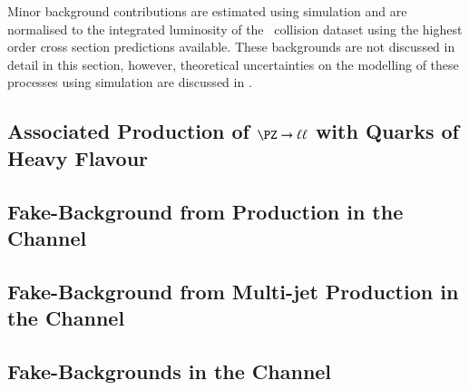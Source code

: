 Minor background contributions are estimated using simulation and are normalised
to the integrated luminosity of the \pp~collision dataset using the highest
order cross section predictions available. These backgrounds are not discussed
in detail in this section, however, theoretical uncertainties on the modelling
of these processes using simulation are discussed in
.

\subsection{Associated Production of $\PZ \to \ell\ell$ with Quarks of Heavy Flavour}%
\label{sec:bkg_zjets}


\subsection{Fake-\tauhadvis Background from \ttbar Production in the \hadhad Channel}%
\label{sec:bkg_hadhad_ttbarfakes}


\subsection{Fake-\tauhadvis Background from Multi-jet Production in the \hadhad Channel}%
\label{sec:bkg_hadhad_ff}%
\label{sec:hadhad_multijet}


\subsection{Fake-\tauhadvis Backgrounds in the \lephad Channel}%
\label{sec:bkg_lephad_combined_ff}



